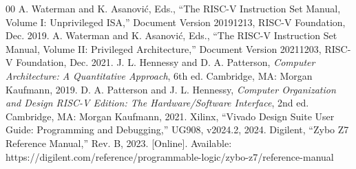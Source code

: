 \documentclass[conference]{IEEEtran}
\begin{document}
\begin{thebibliography}{00}
 A. Waterman and K. Asanovi\'{c}, Eds., ``The RISC-V Instruction Set Manual, Volume I: Unprivileged ISA,'' Document Version 20191213, RISC-V Foundation, Dec. 2019.
 A. Waterman and K. Asanovi\'{c}, Eds., ``The RISC-V Instruction Set Manual, Volume II: Privileged Architecture,'' Document Version 20211203, RISC-V Foundation, Dec. 2021.
 J. L. Hennessy and D. A. Patterson, \textit{Computer Architecture: A Quantitative Approach}, 6th ed. Cambridge, MA: Morgan Kaufmann, 2019.
 D. A. Patterson and J. L. Hennessy, \textit{Computer Organization and Design RISC-V Edition: The Hardware/Software Interface}, 2nd ed. Cambridge, MA: Morgan Kaufmann, 2021.
 Xilinx, ``Vivado Design Suite User Guide: Programming and Debugging,'' UG908, v2024.2, 2024.
 Digilent, ``Zybo Z7 Reference Manual,'' Rev. B, 2023. [Online]. Available: https://digilent.com/reference/programmable-logic/zybo-z7/reference-manual
\end{thebibliography}
\end{document}
